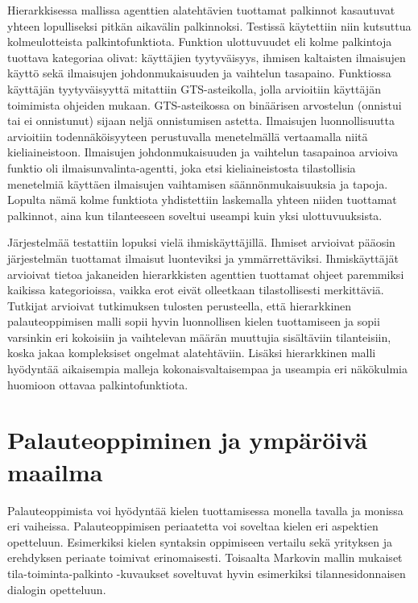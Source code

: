 \documentclass[finnish]{tktltiki2}
\theoremstyle{definition}
\theoremstyle{remark}
\begin{document}
Hierarkkisessa mallissa agenttien alatehtävien tuottamat palkinnot kasautuvat yhteen lopulliseksi pitkän aikavälin palkinnoksi. Testissä käytettiin niin kutsuttua kolmeulotteista palkintofunktiota. Funktion ulottuvuudet eli kolme palkintoja tuottava kategoriaa olivat: käyttäjien tyytyväisyys, ihmisen kaltaisten ilmaisujen käyttö sekä ilmaisujen johdonmukaisuuden ja vaihtelun tasapaino. Funktiossa käyttäjän tyytyväisyyttä mitattiin GTS-asteikolla, jolla arvioitiin käyttäjän toimimista ohjeiden mukaan. GTS-asteikossa on binäärisen arvostelun (onnistui tai ei onnistunut) sijaan neljä onnistumisen astetta. Ilmaisujen luonnollisuutta arvioitiin todennäköisyyteen perustuvalla menetelmällä vertaamalla niitä kieliaineistoon. Ilmaisujen johdonmukaisuuden ja vaihtelun tasapainoa arvioiva funktio oli ilmaisunvalinta-agentti, joka etsi kieliaineistosta tilastollisia menetelmiä käyttäen ilmaisujen vaihtamisen säännönmukaisuuksia ja tapoja. Lopulta nämä kolme funktiota yhdistettiin laskemalla yhteen niiden tuottamat palkinnot, aina kun tilanteeseen soveltui useampi kuin yksi ulottuvuuksista. 
 
Järjestelmää testattiin lopuksi vielä ihmiskäyttäjillä. Ihmiset arvioivat pääosin järjestelmän tuottamat ilmaisut luonteviksi ja ymmärrettäviksi. Ihmiskäyttäjät arvioivat tietoa jakaneiden hierarkkisten agenttien tuottamat ohjeet paremmiksi kaikissa kategorioissa, vaikka erot eivät olleetkaan tilastollisesti merkittäviä. Tutkijat arvioivat tutkimuksen tulosten perusteella, että hierarkkinen palauteoppimisen malli sopii hyvin luonnollisen kielen tuottamiseen ja sopii varsinkin eri kokoisiin ja vaihtelevan määrän muuttujia sisältäviin tilanteisiin, koska jakaa kompleksiset ongelmat alatehtäviin. Lisäksi hierarkkinen malli hyödyntää aikaisempia malleja kokonaisvaltaisempaa ja useampia eri näkökulmia huomioon ottavaa palkintofunktiota.

\section{Palauteoppiminen ja ympäröivä maailma}

Palauteoppimista voi hyödyntää kielen tuottamisessa monella tavalla ja monissa eri vaiheissa. Palauteoppimisen periaatetta voi soveltaa kielen eri aspektien opetteluun. Esimerkiksi kielen syntaksin oppimiseen vertailu sekä yrityksen ja erehdyksen periaate toimivat erinomaisesti. Toisaalta Markovin mallin mukaiset tila-toiminta-palkinto -kuvaukset soveltuvat hyvin esimerkiksi tilannesidonnaisen dialogin opetteluun. 
 
\end{document}
